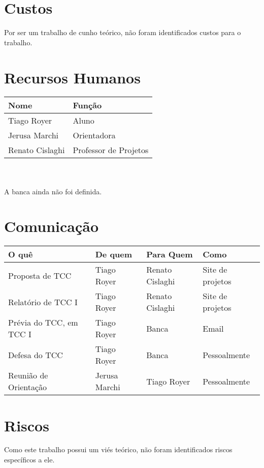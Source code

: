 \documentclass[12pt]{article}
\begin{document}
\section{Custos}
    Por ser um trabalho de cunho teórico, não foram identificados custos para o trabalho.

\section{Recursos Humanos}
    \begin{tabular}{l l}
        \hline
        Nome            & Função \\
        \hline
        Tiago Royer     & Aluno \\
        Jerusa Marchi   & Orientadora \\
        Renato Cislaghi & Professor de Projetos \\
        \hline
    \end{tabular}
    \\
    \\
    A banca ainda não foi definida.

\section{Comunicação}
    \begin{tabular}{l l l l}
        \hline
        O quê                   & De quem       & Para Quem         & Como \\
        \hline
        Proposta de TCC         & Tiago Royer   & Renato Cislaghi   & Site de projetos \\
        Relatório de TCC I      & Tiago Royer   & Renato Cislaghi   & Site de projetos \\
        Prévia do TCC, em TCC I & Tiago Royer   & Banca             & Email \\
        Defesa do TCC           & Tiago Royer   & Banca             & Pessoalmente \\
        Reunião de Orientação   & Jerusa Marchi & Tiago Royer       & Pessoalmente \\
        \hline
    \end{tabular}

\section{Riscos}
    Como este trabalho possui um viés teórico, não foram identificados
    riscos específicos a ele.



\end{document}
